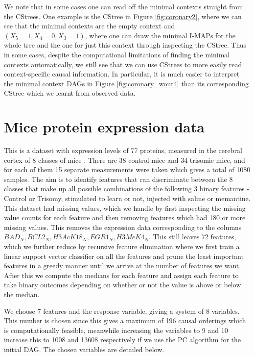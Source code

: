 \documentclass{tufte-book}
\begin{document}
We note that in some cases one can read off the minimal contexts straight from the CStrees. One example is the CStree in Figure \ref{fig:coronary2}, where we can see that the minimal contexts are the empty context and \((X_5=1,X_4=0,X_3=1)\), where one can draw the minimal I-MAPs for the whole tree and the one for just this context through inspecting the CStree. Thus in some cases, despite the computational limitations of finding the minimal contexts automatically, we still see that we can use CStrees to more easily read context-specific causal information. In particular, it is much easier to interpret the minimal context DAGs in Figure \ref{fig:coronary_wout4} than its corresponding CStree which we learnt from observed data.

\section{Mice protein expression data}
\label{sec:orgef04399}
This is a dataset with expression levels of 77 proteins, measured in the cerebral cortex of 8 classes of mice \cite{higuera-2015-self-organ}. There are 38 control mice and 34 trisomic mice, and for each of them 15 separate measurements were taken which gives a total of 1080 samples. The aim is to identify features that can discriminate between the 8 classes that make up all possible combinations of the following 3 binary features - Control or Trisomy, stimulated to learn or not, injected with saline or memantine. This dataset had missing values, which we handle by first inspecting the missing value counts for each feature and then removing features which had 180 or more missing values. This removes the expression data corresponding to the columns \(BAD_N, BCL2_N, H3AcK18_N, EGR1_N, H3MeK4_N\). This still leaves 72 features, which we further reduce by recursive feature elimination \cite{guyon-2002} where we first train a linear support vector classifier on all the features and prune the least important features in a greedy manner until we arrive at the number of features we want. After this we compute the medians for each feature and assign each feature to take binary outcomes depending on whether or not the value is above or below the median.



We choose 7 features and the response variable, giving a system of 8 variables. This number is chosen since this gives a maximum of 196 causal orderings which is computationally feasible, meanwhile increasing the variables to 9 and 10 increase this to 1008 and 13608 respectively if we use the PC algorithm for the initial DAG. The chosen variables are detailed below.
\end{document}

